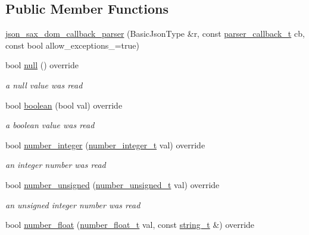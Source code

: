 \subsection*{Public Member Functions}
\begin{DoxyCompactItemize}
\item 
\hyperlink{classnlohmann_1_1detail_1_1json__sax__dom__callback__parser_afec9434e54590f10df51b062973d4daf}{json\+\_\+sax\+\_\+dom\+\_\+callback\+\_\+parser} (Basic\+Json\+Type \&r, const \hyperlink{classnlohmann_1_1detail_1_1json__sax__dom__callback__parser_a4f636086fa8e7cf26c35c8afd50903ce}{parser\+\_\+callback\+\_\+t} cb, const bool allow\+\_\+exceptions\+\_\+=true)
\item 
bool \hyperlink{classnlohmann_1_1detail_1_1json__sax__dom__callback__parser_a2db7733c5d6fb6135f03f8b64811baf4}{null} () override
\begin{DoxyCompactList}\small\item\em a null value was read \end{DoxyCompactList}\item 
bool \hyperlink{classnlohmann_1_1detail_1_1json__sax__dom__callback__parser_a945cb4ac399dad288ad31a67f26590a2}{boolean} (bool val) override
\begin{DoxyCompactList}\small\item\em a boolean value was read \end{DoxyCompactList}\item 
bool \hyperlink{classnlohmann_1_1detail_1_1json__sax__dom__callback__parser_ad9a642701515c3cd85e6d72f9fa117c9}{number\+\_\+integer} (\hyperlink{structnlohmann_1_1json__sax_a0cef30121f02b7fee85e9708148ea0aa}{number\+\_\+integer\+\_\+t} val) override
\begin{DoxyCompactList}\small\item\em an integer number was read \end{DoxyCompactList}\item 
bool \hyperlink{classnlohmann_1_1detail_1_1json__sax__dom__callback__parser_abdbdf0d6cd07a997217ce74df8a42493}{number\+\_\+unsigned} (\hyperlink{structnlohmann_1_1json__sax_a32028cc056ae0f43aaae331cdbbbf856}{number\+\_\+unsigned\+\_\+t} val) override
\begin{DoxyCompactList}\small\item\em an unsigned integer number was read \end{DoxyCompactList}\item 
bool \hyperlink{classnlohmann_1_1detail_1_1json__sax__dom__callback__parser_a1025e6ef04761f4218294efaac4f34fd}{number\+\_\+float} (\hyperlink{structnlohmann_1_1json__sax_a390c209bffd8c4800c8f3076dc465a20}{number\+\_\+float\+\_\+t} val, const \hyperlink{structnlohmann_1_1json__sax_ae01977a9f3c5b3667b7a2929ed91061e}{string\+\_\+t} \&) override

\end{DoxyCompactItemize}
